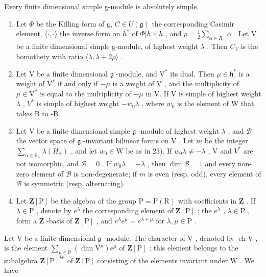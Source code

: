 Every finite dimensional simple g-module is absolutely simple.

\begin{enumerate}
\def\labelenumi{\arabic{enumi})}
\setcounter{enumi}{21}
\item
  Let \(\varPhi\) be the Killing form of g, \(C \in U(\mathfrak{g})\) the corresponding Casimir element, \(\langle\cdot,\cdot\rangle\) the inverse form on \(h^{*}\) of \(\varPhi|h \times h\) , and \(\rho = \frac{1}{2} \sum_{\alpha \in R_{+}} \alpha\) . Let V be a finite dimensional simple g-module, of highest weight \(\lambda\) . Then \(C_{V}\) is the homothety with ratio \(\langle\lambda, \lambda + 2\rho\rangle\) .
\item
  Let \(\mathrm{V}\) be a finite dimensional \(\mathfrak{g}\) -module, and \(\mathrm{V}^*\) its dual. Then \(\mu \in \mathfrak{h}^*\) is a weight of \(\mathrm{V}^*\) if and only if \(-\mu\) is a weight of \(\mathrm{V}\) , and the multiplicity of \(\mu \in \mathrm{V}^*\) is equal to the multiplicity of \(-\mu\) in V. If V is simple of highest weight \(\lambda\) , \(V^{*}\) is simple of highest weight \(-w_{0}\lambda\) , where \(w_{0}\) is the element of W that takes B to -B.
\item
  Let \(\mathrm{V}\) be a finite dimensional simple \(\mathfrak{g}\) -module of highest weight \(\lambda\) , and \(\mathcal{B}\) the vector space of \(\mathfrak{g}\) -invariant bilinear forms on \(\mathrm{V}\) . Let \(m\) be the integer \(\sum_{\alpha \in \mathbb{R}_+} \lambda(H_\alpha)\) , and let \(w_0 \in \mathrm{W}\) be as in 23). If \(w_0 \lambda \neq -\lambda\) , \(\mathrm{V}\) and \(V^*\) are not isomorphic, and \(\mathcal{B} = 0\) . If \(w_0 \lambda = -\lambda\) , then \(\dim \mathcal{B} = 1\) and every non-zero element of \(\mathcal{B}\) is non-degenerate; if \(m\) is even (resp. odd), every element of \(\mathcal{B}\) is symmetric (resp. alternating).
\item
  Let \(\mathbf{Z}[\mathrm{P}]\) be the algebra of the group \(\mathrm{P} = \mathrm{P}(\mathrm{R})\) with coefficients in \(\mathbf{Z}\) . If \(\lambda \in \mathrm{P}\) , denote by \(e^{\lambda}\) the corresponding element of \(\mathbf{Z}[\mathrm{P}]\) ; the \(e^{\lambda}\) , \(\lambda \in \mathrm{P}\) , form a \(\mathbf{Z}\) -basis of \(\mathbf{Z}[\mathrm{P}]\) , and \(e^{\lambda}e^{\mu} = e^{\lambda +\mu}\) for \(\lambda, \mu \in \mathrm{P}\) .
\end{enumerate}

Let \(\mathrm{V}\) be a finite dimensional \(\mathfrak{g}\) -module. The character of \(\mathrm{V}\) , denoted by \(\operatorname{ch} \mathrm{V}\) , is the element \(\sum_{\mu \in \mathrm{P}} (\dim \mathrm{V}^{\mu}) e^{\mu}\) of \(\mathbf{Z}[\mathrm{P}]\) ; this element belongs to the subalgebra \(\mathbf{Z}[\mathrm{P}]^{\mathrm{W}}\) of \(\mathbf{Z}[\mathrm{P}]\) consisting of the elements invariant under \(\mathrm{W}\) . We have

